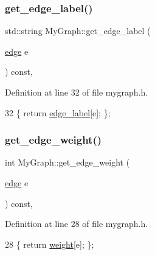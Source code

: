 \subsubsection{\texorpdfstring{get\+\_\+edge\+\_\+label()}{get\_edge\_label()}}
{\footnotesize\ttfamily std\+::string My\+Graph\+::get\+\_\+edge\+\_\+label (\begin{DoxyParamCaption}\item[{\mbox{\hyperlink{classedge}{edge}}}]{e }\end{DoxyParamCaption}) const\hspace{0.3cm}{\ttfamily [inline]}, {\ttfamily [inherited]}}



Definition at line 32 of file mygraph.\+h.


\begin{DoxyCode}
32 \{ \textcolor{keywordflow}{return} \mbox{\hyperlink{class_my_graph_ac87b3f22352ddc7ec3864173a0d69cdd}{edge\_label}}[e]; \};
\end{DoxyCode}
\mbox{\label{class_my_graph_aed4da227ae0cfe5565fa23acb4c4776c}} 
\subsubsection{\texorpdfstring{get\+\_\+edge\+\_\+weight()}{get\_edge\_weight()}}
{\footnotesize\ttfamily int My\+Graph\+::get\+\_\+edge\+\_\+weight (\begin{DoxyParamCaption}\item[{\mbox{\hyperlink{classedge}{edge}}}]{e }\end{DoxyParamCaption}) const\hspace{0.3cm}{\ttfamily [inline]}, {\ttfamily [inherited]}}



Definition at line 28 of file mygraph.\+h.


\begin{DoxyCode}
28 \{ \textcolor{keywordflow}{return} \mbox{\hyperlink{class_my_graph_aa6e12f16153220780e9db1eb30112b34}{weight}}[e]; \};    
\end{DoxyCode}
\mbox{\label{class_my_tree_ad24d047e2da5b363401a74977cde423c}} 
